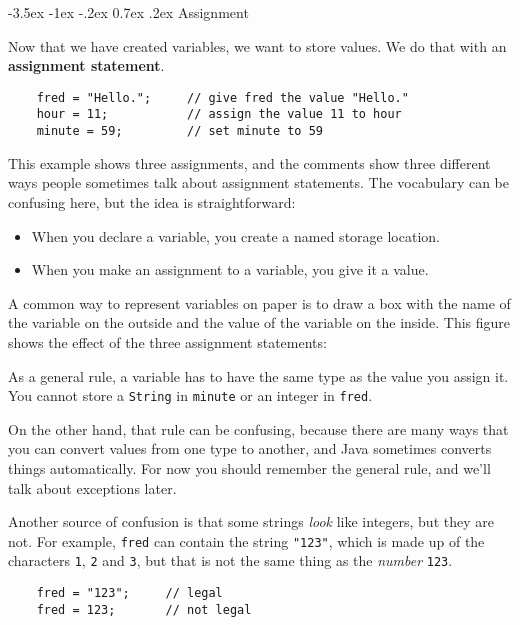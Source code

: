 \documentclass{book}
\makeatletter
\renewcommand{\section}{\@startsection 
    {section} {1} {0mm}%
    {-3.5ex \@plus -1ex \@minus -.2ex}%
    {0.7ex \@plus.2ex}%
    {\normalfont\Large\bfseries}}
\newcommand{\beforefig}{\vspace{1.3\parskip}}
\newcommand{\afterfig}{\vspace{-0.2\parskip}}
\newcommand{\myfig}[1]{
    \beforefig
    \centerline{\epsfig{#1,scale=0.8}}
    \afterfig
}
\makeatother
\begin{document}
\section{Assignment}

Now that we have created variables, we want to
store values.  We do that with an {\bf assignment
statement}.

\begin{verbatim}
    fred = "Hello.";     // give fred the value "Hello."
    hour = 11;           // assign the value 11 to hour
    minute = 59;         // set minute to 59
\end{verbatim}
%
This example shows three assignments, and the comments show
three different ways people sometimes talk about assignment
statements.  The vocabulary can be confusing here, but the
idea is straightforward:

\begin{itemize}

\item When you declare a variable, you create a named storage location.

\item When you make an assignment to a variable, you give it a value.

\end{itemize}

A common way to represent variables on paper is to draw a box
with the name of the variable on the outside and the value
of the variable on the inside.  This figure shows
the effect of the three assignment statements:


\myfig{figure=figs/assign.eps}


As a general rule,
a variable has to have the same type as the
value you assign it.  You cannot store a {\tt String} in {\tt minute} or an
integer in {\tt fred}.

On the other hand, that rule can be confusing, because there are many
ways that you can convert values from one type to another, and Java
sometimes converts things automatically.  For now you should
remember the general rule, and we'll talk about exceptions later.

Another source of confusion is that some strings {\em look}
like integers, but they are not.  For example, {\tt fred}
can contain the string {\tt "123"}, which is made up of the
characters {\tt 1}, {\tt 2} and {\tt 3}, but that is not
the same thing as the {\em number} {\tt 123}.

\begin{verbatim}
    fred = "123";     // legal
    fred = 123;       // not legal
\end{verbatim}
\end{document}

